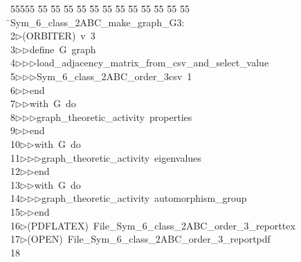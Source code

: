 %
%
\begin{tabbing}
55555 \= 55 \= 55 \= 55 \= 55 \= 55 \= 55 \= 55 \= 55 \= 55 \= 55 \= 55 \= 55 \= \>Sym\_6\_class\_2ABC\_make\_graph\_G3:\\[0pt]
2\>$\triangleright$\>(ORBITER)\ v\ 3\ \\[0pt]
3\>$\triangleright$\>$\triangleright$\>define\ G\ graph\ \\[0pt]
4\>$\triangleright$\>$\triangleright$\>$\triangleright$\>load\_adjacency\_matrix\_from\_csv\_and\_select\_value\ \\[0pt]
5\>$\triangleright$\>$\triangleright$\>$\triangleright$\>Sym\_6\_class\_2ABC\_order\_3csv\ 1\ \\[0pt]
6\>$\triangleright$\>$\triangleright$\>end\ \\[0pt]
7\>$\triangleright$\>$\triangleright$\>with\ G\ do\ \\[0pt]
8\>$\triangleright$\>$\triangleright$\>$\triangleright$\>graph\_theoretic\_activity\ properties\ \\[0pt]
9\>$\triangleright$\>$\triangleright$\>end\ \\[0pt]
10\>$\triangleright$\>$\triangleright$\>with\ G\ do\ \\[0pt]
11\>$\triangleright$\>$\triangleright$\>$\triangleright$\>graph\_theoretic\_activity\ eigenvalues\ \\[0pt]
12\>$\triangleright$\>$\triangleright$\>end\ \\[0pt]
13\>$\triangleright$\>$\triangleright$\>with\ G\ do\ \\[0pt]
14\>$\triangleright$\>$\triangleright$\>$\triangleright$\>graph\_theoretic\_activity\ automorphism\_group\ \\[0pt]
15\>$\triangleright$\>$\triangleright$\>end\\[0pt]
16\>$\triangleright$\>(PDFLATEX)\ File\_Sym\_6\_class\_2ABC\_order\_3\_reporttex\\[0pt]
17\>$\triangleright$\>(OPEN)\ File\_Sym\_6\_class\_2ABC\_order\_3\_reportpdf\\[0pt]
18\>\end{tabbing}

